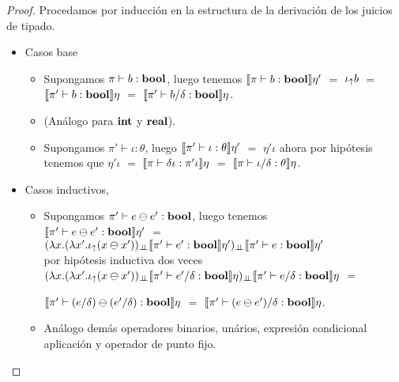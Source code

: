 \begin{proof}
Procedamos por inducci\'on en la estructura de la derivaci\'on de los juicios de tipado.\\

\begin{itemize}

\item Casos base
\begin{itemize}
\item Supongamos $\pi \vdash b : \textbf{bool}$, luego tenemos 
$\llbracket \pi \vdash b : \textbf{bool} \rrbracket\eta'$ $=$ $\iota_{\uparrow} b$ $=$ 
$\llbracket \pi' \vdash b : \textbf{bool} \rrbracket\eta$ $=$ $\llbracket \pi' \vdash b / \delta : \textbf{bool} \rrbracket\eta$.

\item (An\'alogo para $\textbf{int}$ y $\textbf{real}$).

\item Supongamos $\pi' \vdash \iota : \theta$, luego 
$\llbracket \pi' \vdash \iota : \theta \rrbracket\eta'$ $=$ $\eta'\iota$
ahora por hip\'otesis tenemos que 
$\eta'\iota$ $=$ $\llbracket \pi \vdash \delta\iota : \pi'\iota \rrbracket\eta$ $=$
$\llbracket \pi \vdash \iota / \delta : \theta \rrbracket\eta$.
\end{itemize}

\item Casos inductivos,
\begin{itemize}
\item Supongamos $\pi' \vdash e \ominus e' : \textbf{bool}$, luego tenemos \\
$\llbracket \pi' \vdash e \ominus e' : \textbf{bool} \rrbracket\eta'$ $=$
	$(\lambda x . 
		(\lambda x' . \iota_{\uparrow} (x \ominus x'))_{\bot \!\!\! \bot}
					\llbracket \pi' \vdash e' : \textbf{bool} \rrbracket\eta')_{\bot \!\!\! \bot}
						\llbracket \pi' \vdash e : \textbf{bool} \rrbracket\eta'$ \\
						
por hip\'otesis inductiva dos veces\\

$(\lambda x . 
		(\lambda x' . \iota_{\uparrow} (x \ominus x'))_{\bot \!\!\! \bot}
					\llbracket \pi' \vdash e' / \delta : \textbf{bool} \rrbracket\eta)_{\bot \!\!\! \bot}
						\llbracket \pi' \vdash e / \delta : \textbf{bool} \rrbracket\eta$ $=$
						
$\llbracket \pi' \vdash (e / \delta) \ominus (e' / \delta) : \textbf{bool} \rrbracket\eta$ $=$
$\llbracket \pi' \vdash (e \ominus e') / \delta : \textbf{bool} \rrbracket\eta$.\\

\item An\'alogo dem\'as operadores binarios, un\'arios, expresi\'on condicional
aplicaci\'on y operador de punto fijo.\\


\end{itemize}
\end{itemize}
\end{proof}
